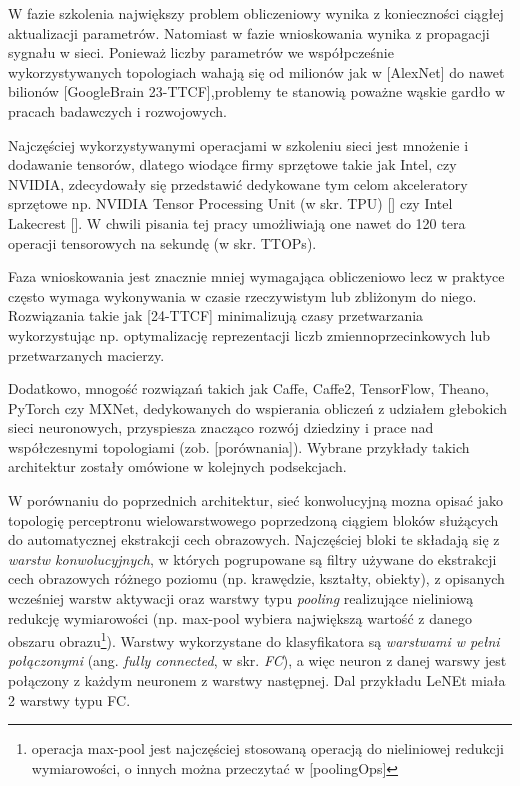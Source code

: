 W fazie szkolenia największy problem obliczeniowy wynika z konieczności ciągłej aktualizacji parametrów. Natomiast w fazie wnioskowania wynika z propagacji sygnału w sieci. Ponieważ liczby parametrów we współpcześnie wykorzystywanych topologiach wahają się od milionów jak w [AlexNet] do nawet bilionów [GoogleBrain 23-TTCF],problemy te stanowią poważne wąskie gardło w pracach badawczych i rozwojowych.

Najczęściej wykorzystywanymi operacjami w szkoleniu sieci jest mnożenie i dodawanie tensorów, dlatego wiodące firmy sprzętowe takie jak Intel, czy NVIDIA, zdecydowały się przedstawić dedykowane tym celom akceleratory sprzętowe np. NVIDIA Tensor Processing Unit (w skr. TPU) [] czy Intel Lakecrest []. W chwili pisania tej pracy umożliwiają one nawet do 120 tera operacji tensorowych na sekundę (w skr. TTOPs).

Faza wnioskowania jest znacznie mniej wymagająca obliczeniowo lecz w praktyce często wymaga wykonywania w czasie rzeczywistym lub zbliżonym do niego. Rozwiązania takie jak [24-TTCF] minimalizują czasy przetwarzania wykorzystując np. optymalizację reprezentacji liczb zmiennoprzecinkowych lub przetwarzanych macierzy.

Dodatkowo, mnogość rozwiązań takich jak Caffe, Caffe2, TensorFlow, Theano, PyTorch czy MXNet, dedykowanych do wspierania obliczeń z udziałem głebokich sieci neuronowych, przyspiesza znacząco rozwój dziedziny i prace nad współczesnymi topologiami (zob. [porównania]). Wybrane przykłady takich architektur zostały omówione w kolejnych podsekcjach. 

W porównaniu do poprzednich architektur, sieć konwolucyjną mozna opisać jako topologię perceptronu wielowarstwowego poprzedzoną ciągiem bloków służących do automatycznej ekstrakcji cech obrazowych. Najczęściej bloki te składają się z \textit{warstw konwolucyjnych}, w których pogrupowane są filtry używane do ekstrakcji cech obrazowych różnego poziomu (np. krawędzie, kształty, obiekty), z opisanych wcześniej warstw aktywacji oraz warstwy typu \textit{pooling} realizujące nieliniową redukcję wymiarowości (np. max-pool wybiera największą wartość z danego obszaru obrazu\footnote{operacja max-pool jest najczęściej stosowaną operacją do nieliniowej redukcji wymiarowości, o innych można przeczytać w [poolingOps]}). Warstwy wykorzystane do klasyfikatora są \textit{warstwami w pełni połączonymi} (ang. \textit{fully connected}, w skr. \textit{FC}), a więc neuron z danej warswy jest połączony z każdym neuronem z warstwy następnej. Dal przykładu LeNEt miała 2 warstwy typu FC.

